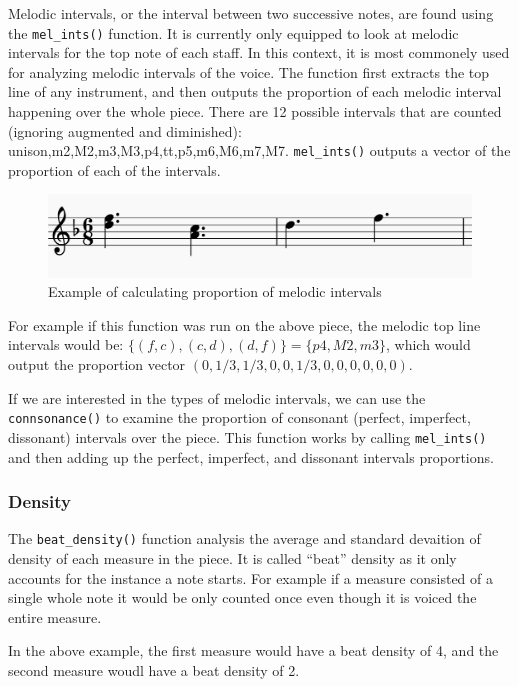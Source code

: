\documentclass[12pt,twoside]{reedthesis}
\theoremstyle{definition}
\theoremstyle{definition}
\theoremstyle{definition}
\theoremstyle{remark}
\begin{document}
Melodic intervals, or the interval between two successive notes, are
found using the \texttt{mel\_ints()} function. It is currently only
equipped to look at melodic intervals for the top note of each staff. In
this context, it is most commonely used for analyzing melodic intervals
of the voice. The function first extracts the top line of any
instrument, and then outputs the proportion of each melodic interval
happening over the whole piece. There are 12 possible intervals that are
counted (ignoring augmented and diminished):
unison,m2,M2,m3,M3,p4,tt,p5,m6,M6,m7,M7. \texttt{mel\_ints()} outputs a
vector of the proportion of each of the intervals.
\begin{figure}[h]
\centering
\includegraphics[scale = .5]{images/ex2.png}
\caption{Example of calculating proportion of melodic intervals}
\label{subd}
\end{figure}
For example if this function was run on the above piece, the melodic top
line intervals would be: \(\{(f,c),(c,d),(d,f)\} = \{p4,M2,m3\}\), which
would output the proportion vector \((0,1/3,1/3,0,0,1/3,0,0,0,0,0,0)\).

If we are interested in the types of melodic intervals, we can use the
\texttt{connsonance()} to examine the proportion of consonant (perfect,
imperfect, dissonant) intervals over the piece. This function works by
calling \texttt{mel\_ints()} and then adding up the perfect, imperfect,
and dissonant intervals proportions.

\subsubsection{Density}\label{density}

The \texttt{beat\_density()} function analysis the average and standard
devaition of density of each measure in the piece. It is called ``beat''
density as it only accounts for the instance a note starts. For example
if a measure consisted of a single whole note it would be only counted
once even though it is voiced the entire measure.

In the above example, the first measure would have a beat density of 4,
and the second measure woudl have a beat density of 2.
\end{document}
